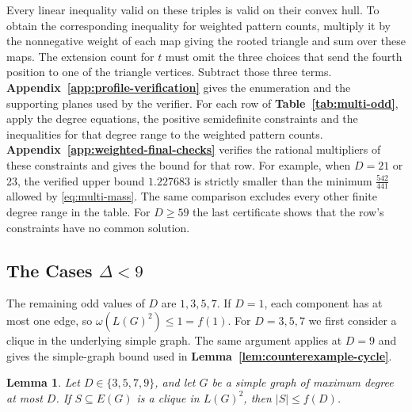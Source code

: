 \documentclass[preprint,11pt,numbers]{elsarticle-arxiv}
\numberwithin{equation}{section}
\newtheorem{lemma}[theorem]{Lemma}
\theoremstyle{definition}
\begin{document}
\relax\space%
Every linear inequality valid on these triples is valid on their
convex hull. To obtain the corresponding inequality for weighted
pattern counts, multiply it by the nonnegative weight of each
map giving the rooted triangle and sum over these maps. The
extension count for $t$ must omit the three choices that send the
fourth position to one of the triangle vertices. Subtract those
three terms. \textbf{Appendix~\ref{app:profile-verification}} gives
the enumeration and the supporting planes used by the verifier.
\relax\space%
For each row of \textbf{Table~\ref{tab:multi-odd}}, apply the
degree equations, the positive semidefinite constraints and the
inequalities for that degree range to the weighted pattern counts.
\textbf{Appendix~\ref{app:weighted-final-checks}} verifies the rational
multipliers of these constraints and gives the bound for that row.
For example, when $D=21$ or 23, the verified upper bound $1.227683$
is strictly smaller than the minimum $\frac{542}{441}$ allowed by
\eqref{eq:multi-mass}. The same comparison excludes every other
finite degree range in the table. For $D\geq59$ the last certificate
shows that the row's constraints have no common solution.

\subsection{The Cases \texorpdfstring{$\Delta<9$}{Delta < 9}}\label{subsec:exact-small-degree}

The remaining odd values of $D$ are $1,3,5,7$. If $D=1$, each
component has at most one edge, so $\omega(L(G)^2)\leq1=f(1)$.
For $D=3,5,7$ we first consider a clique in the underlying simple graph.
The same argument applies at $D=9$ and gives the simple-graph
bound used in \textbf{Lemma~\ref{lem:counterexample-cycle}}.

\begin{lemma}\label{lem:simple-small-support}
Let $D\in\{3,5,7,9\}$, and let $G$ be a simple graph of maximum
degree at most $D$. If $S\subseteq E(G)$ is a clique in $L(G)^2$,
then $|S|\leq f(D)$.
\end{lemma}
\end{document}

